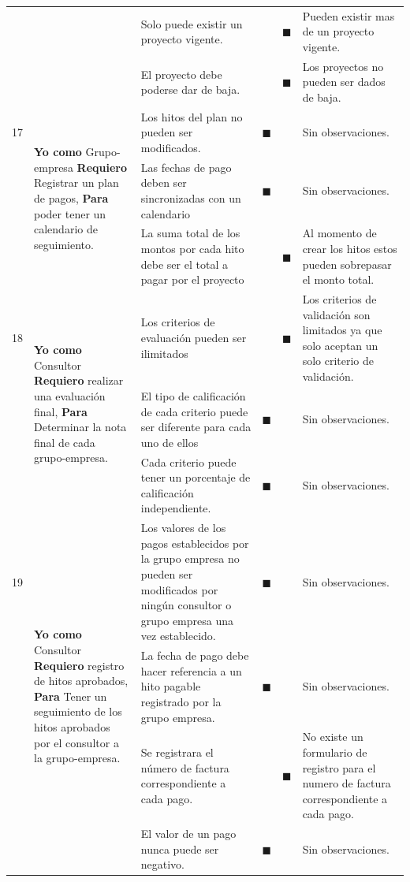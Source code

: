 \documentclass[letterpaper,11pt]{article}
\begin{document}
\begin{landscape}
\begin{tabular}{|c|p{5cm}|p{7.5cm}|c|c|p{7.5cm}|}
			& & Solo puede existir un proyecto vigente. & & $\blacksquare$ & Pueden existir mas de un proyecto vigente. \\ \cline{3-6}
			& & El proyecto debe poderse dar de baja. & & $\blacksquare$ & Los proyectos no pueden ser dados de baja. \\ \hline
			17 & \multirow{3}{5cm}{\textbf{Yo como} Grupo-empresa \textbf{Requiero} Registrar un plan de pagos, \textbf{Para} poder tener un calendario de seguimiento.} & Los hitos del plan no pueden ser modificados. & $\blacksquare$ & & Sin observaciones. \\ \cline{3-6}
			& & Las fechas de pago deben ser sincronizadas con un calendario & $\blacksquare$ & & Sin observaciones. \\ \cline{3-6}
			& & La suma total de los montos por cada hito debe ser el total a pagar por el proyecto & & $\blacksquare$ & Al momento de crear los hitos estos pueden sobrepasar el monto total. \\ \hline
			18 & \multirow{3}{5cm}{\textbf{Yo como} Consultor \textbf{Requiero} realizar una evaluación final, \textbf{Para} Determinar la nota final de cada grupo-empresa.} & Los criterios de evaluación pueden ser ilimitados & & $\blacksquare$ & Los criterios de validación son limitados ya que solo aceptan un solo criterio de validación. \\ \cline{3-6}
			& & El tipo de calificación de cada criterio puede ser diferente para cada uno de ellos & $\blacksquare$ & & Sin observaciones. \\ \cline{3-6} 
			& & Cada criterio puede tener un porcentaje de calificación independiente. & $\blacksquare$ & & Sin observaciones. \\ \hline
			19 & \multirow{4}{5cm}{\textbf{Yo como} Consultor \textbf{Requiero} registro de hitos aprobados, \textbf{Para} Tener un seguimiento de los hitos aprobados por el consultor a la grupo-empresa.} & Los valores de los pagos establecidos por la grupo empresa no pueden ser modificados por ningún consultor o grupo empresa una vez establecido. & $\blacksquare$ & & Sin observaciones. \\ \cline{3-6} 
			& & La fecha de pago debe hacer referencia a un hito pagable registrado por la grupo empresa. & $\blacksquare$ & & Sin observaciones. \\ \cline{3-6} 
			& & Se registrara el número de factura correspondiente a cada pago. & & $\blacksquare$ & No existe un formulario de registro para  el numero de factura correspondiente a cada pago. \\ \cline{3-6} 
			& & El valor de un pago nunca puede ser negativo. & $\blacksquare$ & & Sin observaciones. \\ \hline 
		\end{tabular}
	\end{landscape}
\end{document}
